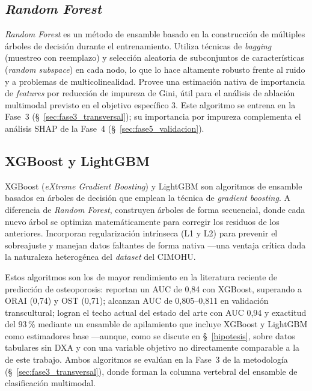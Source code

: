 \documentclass[../tesis.tex]{subfiles}
\begin{document}
\subsection{\textit{Random Forest}}
\label{subsec:rf}

\textit{Random Forest} es un método de ensamble basado en la construcción de múltiples árboles de
decisión durante el entrenamiento.
Utiliza técnicas de \textit{bagging} (muestreo con reemplazo) y selección aleatoria de
subconjuntos de características (\textit{random subspace}) en cada nodo, lo que lo hace altamente
robusto frente al ruido y a problemas de multicolinealidad.
Provee una estimación nativa de importancia de \textit{features} por reducción de impureza de
Gini, útil para el análisis de ablación multimodal previsto en el objetivo específico 3.
Este algoritmo se entrena en la Fase~3 (§~\ref{sec:fase3_transversal}); su importancia por
impureza complementa el análisis SHAP de la Fase~4 (§~\ref{sec:fase5_validacion}).

\subsection{XGBoost y LightGBM}
\label{subsec:xgboost}

XGBoost (\textit{eXtreme Gradient Boosting}) y LightGBM son algoritmos de ensamble basados en
árboles de decisión que emplean la técnica de \textit{gradient boosting}.
A diferencia de \textit{Random Forest}, construyen árboles de forma secuencial, donde cada nuevo
árbol se optimiza matemáticamente para corregir los residuos de los anteriores.
Incorporan regularización intrínseca (L1 y L2) para prevenir el sobreajuste y manejan datos
faltantes de forma nativa ---una ventaja crítica dada la naturaleza heterogénea del
\textit{dataset} del CIMOHU.

Estos algoritmos son los de mayor rendimiento en la literatura reciente de predicción de
osteoporosis: \textcite{Je2025} reportan un AUC de 0{,}84 con XGBoost, superando a ORAI (0{,}74)
y OST (0{,}71); \textcite{Jin2025} alcanzan AUC de 0{,}805--0{,}811 en validación transcultural;
\textcite{Carvalho2025} logran el techo actual del estado del arte con AUC 0{,}94 y exactitud
del 93\,\% mediante un ensamble de apilamiento que incluye XGBoost y LightGBM como estimadores
base ---aunque, como se discute en §~\ref{hipotesis}, sobre datos tabulares sin DXA y con una
variable objetivo no directamente comparable a la de este trabajo.
Ambos algoritmos se evalúan en la Fase~3 de la metodología (§~\ref{sec:fase3_transversal}),
donde forman la columna vertebral del ensamble de clasificación multimodal.
\end{document}

